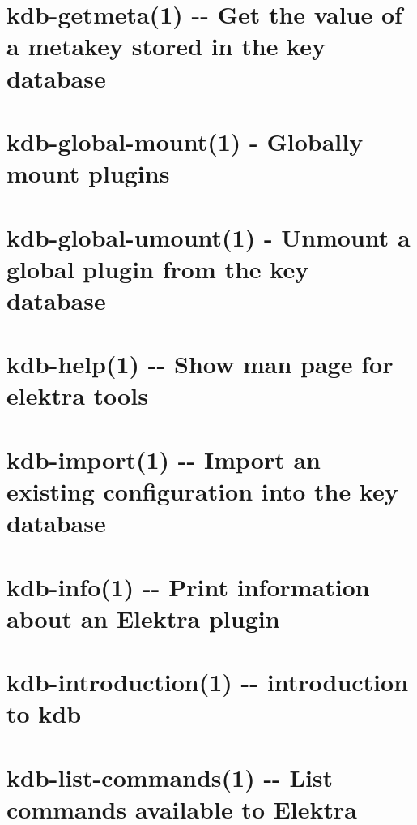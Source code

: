 \documentclass[twoside]{book}
\newcommand{\+}{\discretionary{\mbox{\scriptsize$\hookleftarrow$}}{}{}}
\begin{document}
\chapter{kdb-\/getmeta(1) -\/-\/ Get the value of a metakey stored in the key database}
\label{md_doc_help_kdb-getmeta}

\chapter{kdb-\/global-\/mount(1) -\/ Globally mount plugins}
\label{md_doc_help_kdb-global-mount}

\chapter{kdb-\/global-\/umount(1) -\/ Unmount a global plugin from the key database}
\label{md_doc_help_kdb-global-umount}

\chapter{kdb-\/help(1) -\/-\/ Show man page for elektra tools}
\label{md_doc_help_kdb-help}

\chapter{kdb-\/import(1) -\/-\/ Import an existing configuration into the key database}
\label{md_doc_help_kdb-import}

\chapter{kdb-\/info(1) -\/-\/ Print information about an Elektra plugin}
\label{md_doc_help_kdb-info}

\chapter{kdb-\/introduction(1) -\/-\/ introduction to kdb}
\label{md_doc_help_kdb-introduction}

\chapter{kdb-\/list-\/commands(1) -\/-\/ List commands available to Elektra}
\label{md_doc_help_kdb-list-commands}

\end{document}

